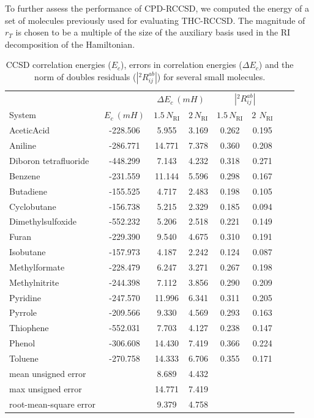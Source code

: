 To further assess the performance of CPD-RCCSD, we computed the energy 
of a set of molecules previously used for evaluating THC-RCCSD. The magnitude 
of $r_{T}$ is chosen to be a multiple of the size of the auxiliary basis used 
in the RI decomposition of the Hamiltonian.
%
\begin{center}
\begin{table}[!ht]
\caption{CCSD correlation energies ($E_c$), errors in
correlation energies ($\Delta E_c$)
and the norm of doubles residuals ($|{}^2R_{ij}^{ab}|$) for several small 
molecules.
\label{tab:energies_cpd_rccsd}}
\begin{tabular}{lccccccc}
\hline \hline
& & \multicolumn{2}{c}{$\Delta E_c~(mH)$} & 
\multicolumn{2}{c}{$|{}^2R_{ij}^{ab}|$}\\
\cline{3-4} \cline{5-6} System & $E_c~(mH)$ & $1.5 \, N_\mathrm{RI}$ &
$2 \, N_\mathrm{RI}$ & $1.5 \, N_\mathrm{RI}$ &
$2 \,~N_\mathrm{RI}$\\
\hline
AceticAcid & -228.506 & 5.955 & 3.169 & 0.262 & 0.195 \\
Aniline & -286.771 & 14.771 & 7.378 & 0.360 & 0.208 \\
Diboron tetrafluoride & -448.299 & 7.143 & 4.232 & 0.318 & 0.271 \\
Benzene & -231.559 & 11.144 & 5.596 & 0.298 & 0.167 \\
Butadiene & -155.525  & 4.717 & 2.483 & 0.198 & 0.105 \\
Cyclobutane & -156.738  & 5.215 & 2.329 & 0.185 & 0.094 \\
Dimethylsulfoxide & -552.232  & 5.206 & 2.518 & 0.221 & 0.149 \\
Furan & -229.390 & 9.540 & 4.675 & 0.310 & 0.191 \\
Isobutane & -157.973 & 4.187 & 2.242 & 0.124 & 0.087 \\
Methylformate & -228.479 & 6.247 & 3.271 & 0.267 & 0.198 \\
Methylnitrite & -244.398 & 7.112 & 3.856 & 0.290 & 0.209 \\
Pyridine & -247.570 & 11.996 & 6.341 & 0.311 & 0.205 \\
Pyrrole & -209.566 & 9.330 & 4.569 & 0.293 & 0.163 \\
Thiophene & -552.031 & 7.703 & 4.127 & 0.238 & 0.147 \\
Phenol & -306.608 & 14.430 & 7.419 & 0.366 & 0.224 \\
Toluene & -270.758 & 14.333 & 6.706 & 0.355 & 0.171 \\
mean unsigned error & & 8.689 & 4.432 & & &\\
max unsigned error & & 14.771 & 7.419 & & &\\
root-mean-square error& & 9.379 & 4.758 & & &\\
\hline\hline
\end{tabular}
\end{table}
\end{center}
